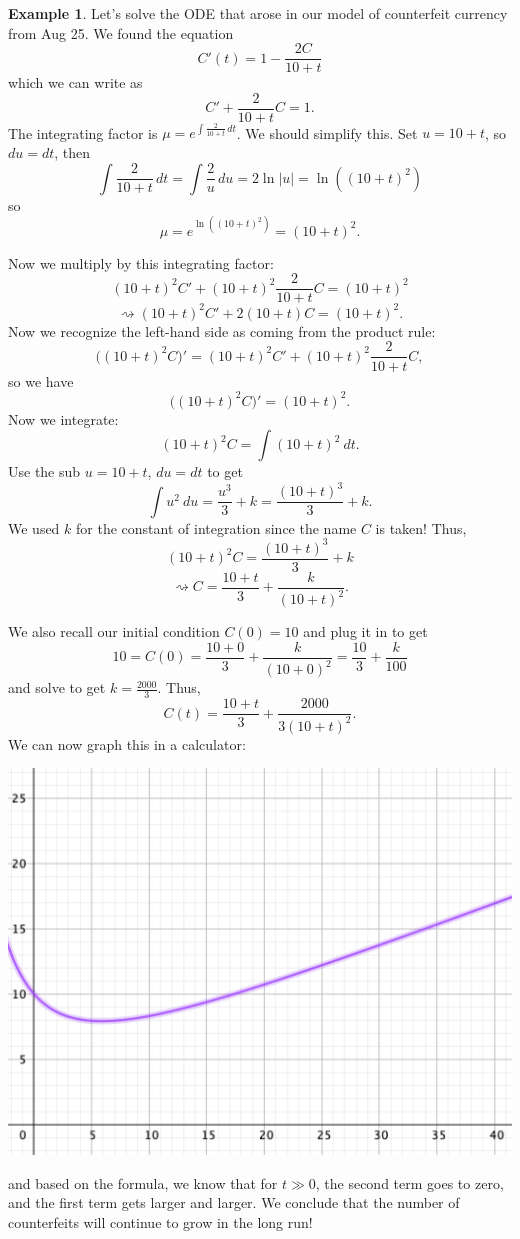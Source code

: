 \documentclass[12pt]{amsart}
\numberwithin{equation}{section}
\theoremstyle{plain} %
\newcommand{\rsa}{\rightsquigarrow}
\theoremstyle{definition}
\newtheorem{ex}[equation]{Example}
\theoremstyle{remark}
\begin{document}
\begin{ex} Let's solve the ODE that arose in our model of counterfeit currency from Aug 25. We found the equation
\[C'(t) = 1-\frac{2C}{10+t}\]
which we can write as
\[ C' + \frac{2}{10+t} C = 1.\]
The integrating factor is $\mu = e^{\int \frac{2}{10+t} \, dt}$.
We should simplify this. Set $u=10+t$, so $du = dt$, then \[\int \frac{2}{10+t} \, dt = \int \frac{2}{u} \, du = 2 \ln|u| = \ln((10+t)^2) \]
so 
\[ \mu = e^ {\ln((10+t)^2)} = (10+t)^2 .\]

Now we multiply by this integrating factor:
\[ (10+t)^2 C' + (10+t)^2\frac{2}{10+t} C = (10+t)^2\]
\[ \rsa (10+t)^2 C' + 2 (10+t) C = (10+t)^2.\]
Now we recognize the left-hand side as coming from the product rule:
\[ \big((10+t)^2 C \big)' = (10+t)^2 C' + (10+t)^2\frac{2}{10+t} C,\]
so we have
\[ \big((10+t)^2 C \big)' =(10+t)^2.\]
Now we integrate:
\[ (10+t)^2 C = \int (10+t)^2 \ dt.\]
Use the sub $u=10+t$, $du=dt$ to get
\[ \int u^2 \ du = \frac{u^3}{3} + k = \frac{(10+t)^3}{3} + k.\]
We used $k$ for the constant of integration since the name $C$ is taken!
Thus,
\[ (10+t)^2 C = \frac{(10+t)^3}{3} + k\]
\[\rsa C = \frac{10+t}{3} + \frac{k}{ (10+t)^2}.\]

We also recall our initial condition $C(0)=10$ and plug it in to get
\[ 10 = C(0) =  \frac{10+0}{3} + \frac{k}{ (10+0)^2} = \frac{10}{3} + \frac{k}{100}\]
and solve to get $k = \frac{2000}{3}$.
Thus,
\[ C(t) =  \frac{10+t}{3} + \frac{2000}{3 (10+t)^2}.\]
We can now graph this in a calculator:
\begin{center}\includegraphics[scale=.5]{gr1}\end{center}
and based on the formula, we know that for $t\gg0$, the second term goes to zero, and the first term gets larger and larger. We conclude that the number of counterfeits will continue to grow in the long run!
\end{ex}
\end{document}
